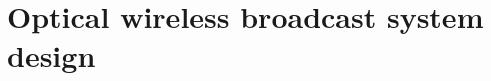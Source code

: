 \chapter{Optical wireless broadcast system design}
\label{chapter:system}
\thispagestyle{myheadings}




